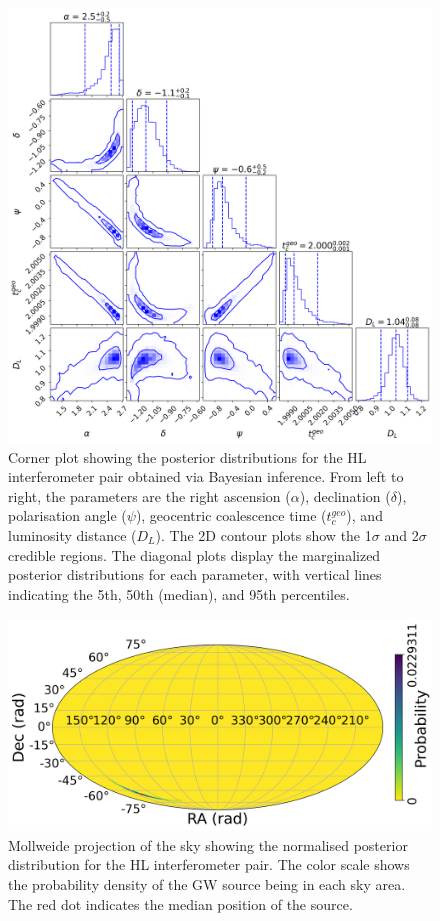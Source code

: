 \documentclass[11pt,a4paper]{article}
\begin{document}
\begin{figure}
    \includegraphics[width=\columnwidth, keepaspectratio]{../figures/corner_HL.png}
    \caption{Corner plot showing the posterior distributions for the HL interferometer pair obtained via Bayesian inference. From left to right, the parameters are the right ascension ($\alpha$), declination ($\delta$), polarisation angle ($\psi$), geocentric coalescence time ($t_c^{geo}$), and luminosity distance ($D_L$). The 2D contour plots show the 1$\sigma$ and 2$\sigma$ credible regions. The diagonal plots display the marginalized posterior distributions for each parameter, with vertical lines indicating the 5th, 50th (median), and 95th percentiles.}
    \label{fig:posterior_hl}
\end{figure}

\begin{figure}
    \includegraphics[width=\columnwidth, keepaspectratio]{../figures/posterior_map_HL.png}
    \caption{Mollweide projection of the sky showing the normalised posterior distribution for the HL interferometer pair. The color scale shows the probability density of the GW source being in each sky area. The red dot indicates the median position of the source.}
    \label{fig:sky_hl}
\end{figure}
\end{document}
